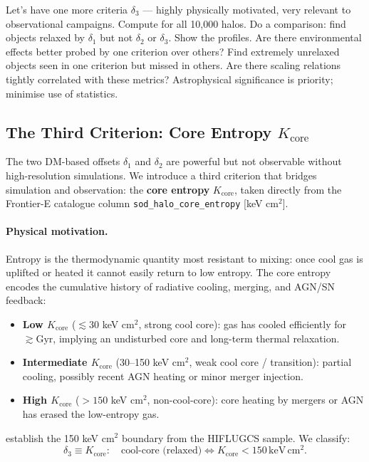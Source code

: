 \documentclass[12pt,a4paper]{article}
\begin{document}
\begin{querybox}
\textcolor{red!80!black}{%
Let's have one more criteria $\delta_3$ --- highly physically motivated, very relevant to
observational campaigns. Compute for all 10,000 halos. Do a comparison: find objects relaxed
by $\delta_1$ but not $\delta_2$ or $\delta_3$. Show the profiles. Are there environmental effects
better probed by one criterion over others? Find extremely unrelaxed objects seen in one criterion
but missed in others. Are there scaling relations tightly correlated with these metrics?
Astrophysical significance is priority; minimise use of statistics.}
\end{querybox}

\subsection{The Third Criterion: Core Entropy $K_\mathrm{core}$}

The two DM-based offsets $\delta_1$ and $\delta_2$ are powerful but not observable
without high-resolution simulations. We introduce a third criterion that bridges
simulation and observation: the \textbf{core entropy} $K_\mathrm{core}$, taken directly
from the Frontier-E catalogue column \texttt{sod\_halo\_core\_entropy} [keV cm$^2$].

\paragraph{Physical motivation.}
Entropy is the thermodynamic quantity most resistant to mixing: once cool gas is
uplifted or heated it cannot easily return to low entropy. The core entropy encodes
the cumulative history of radiative cooling, merging, and AGN/SN feedback:
\begin{itemize}
  \item \textbf{Low $K_\mathrm{core}$} ($\lesssim 30$ keV cm$^2$, strong cool core):
        gas has cooled efficiently for $\gtrsim\mathrm{Gyr}$, implying an undisturbed
        core and long-term thermal relaxation.
  \item \textbf{Intermediate $K_\mathrm{core}$} (30--150 keV cm$^2$, weak cool core /
        transition): partial cooling, possibly recent AGN heating or minor merger
        injection.
  \item \textbf{High $K_\mathrm{core}$} ($> 150$ keV cm$^2$, non-cool-core):
        core heating by mergers or AGN has erased the low-entropy gas.
\end{itemize}
\citet{hudson2010} establish the 150 keV cm$^2$ boundary from the HIFLUGCS sample.
We classify:
\begin{equation}
  \delta_3 \equiv K_\mathrm{core}: \quad
  \text{cool-core (relaxed)} \Leftrightarrow K_\mathrm{core} < 150\,\mathrm{keV\,cm^2}.
\end{equation}
\end{document}
